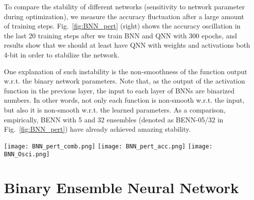 \documentclass[10pt,twocolumn,letterpaper]{article}
\begin{document}
To compare the stability of different networks (sensitivity to network parameter during optimization), we measure the accuracy fluctuation after a large amount of training steps. Fig.~\ref{fig:BNN_pert} (right) shows the accuracy oscillation in the last 20 training steps after we train BNN and QNN with 300 epochs, and results show that we should at least have QNN with weights and activations both 4-bit in order to stabilize the network.

One explanation of such instability is the non-smoothness of the function output w.r.t. the binary network parameters. Note that, as the output of the activation function in the previous layer, the input to each layer of BNNs are binarized numbers. In other words, not only each function is non-smooth w.r.t. the input, but also it is non-smooth w.r.t. the learned parameters.  As a comparison, empirically, BENN with 5 and 32 ensembles (denoted as BENN-05/32 in Fig.~\ref{fig:BNN_pert}) have already achieved amazing stability.


\begin{figure*}[ht!]
    \vspace{-2mm}
    \texttt{[image: BNN\_pert\_comb.png]}
    \label{fig:pert_1}
    \endminipage\hfill
    \texttt{[image: BNN\_pert\_acc.png]}
    \label{fig:pert_2}
    \endminipage\hfill
    \texttt{[image: BNN\_Osci.png]}
    \label{fig:pert_2}
    \endminipage\hfill
    \vspace{-3mm}
    \caption{{\small \textbf{Left: }BNN has large output variation (robustness issue). \textbf{Middle: }BNN has large variation of prediction accuracy (robustness issue). \textbf{Right: }BNN has large test accuracy variation during training (instability issue). BENN can cure these problems. Here, the perturbation variance is 0.01. \textit{(*QNN-W1A2 denotes QNN with 1-bit weights and 2-bit activations and so do others.)}}}
    \label{fig:BNN_pert}
    \vspace{-5mm}
\end{figure*}

\section{Binary Ensemble Neural Network}
\end{document}
